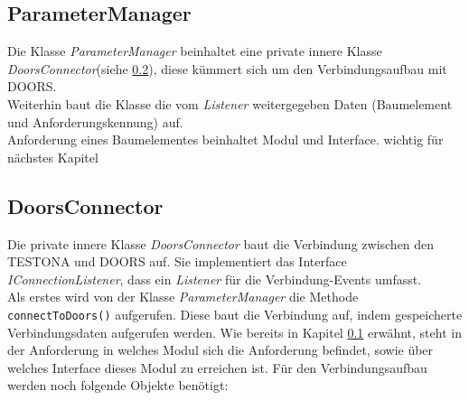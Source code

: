 \subsection{ParameterManager}\label{sub.ParameterManager}


Die Klasse \textit{ParameterManager} beinhaltet eine private innere Klasse \textit{DoorsConnector}(siehe \ref{sub.DoorsConn}), diese kümmert sich um den Verbindungsaufbau mit DOORS.\\ Weiterhin baut die Klasse die vom \textit{Listener} weitergegeben Daten (Baumelement und Anforderungskennung) auf.\\



Anforderung eines Baumelementes beinhaltet Modul und Interface. wichtig für nächstes Kapitel



\subsection{DoorsConnector}\label{sub.DoorsConn}


Die private innere Klasse \textit{DoorsConnector} baut die Verbindung zwischen den TESTONA und DOORS auf. Sie implementiert das Interface \textit{IConnectionListener}, dass ein \textit{Listener} für die Verbindung-Events umfasst.\\

Als erstes wird von der Klasse \textit{ParameterManager} die Methode \texttt{connectToDoors()} aufgerufen. Diese baut die Verbindung auf, indem gespeicherte Verbindungsdaten aufgerufen werden. Wie bereits in Kapitel \ref{sub.ParameterManager} erwähnt, steht in der Anforderung in welches Modul sich die Anforderung befindet, sowie über welches Interface dieses Modul zu erreichen ist. Für den Verbindungsaufbau werden noch folgende Objekte benötigt:

